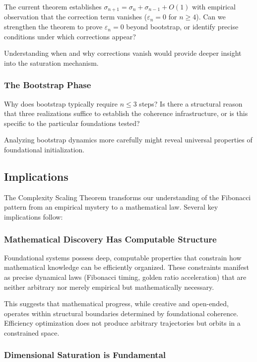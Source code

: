 \documentclass[11pt]{article}
\theoremstyle{definition}
\theoremstyle{remark}
\begin{document}
The current theorem establishes $\sigma_{n+1} = \sigma_n + \sigma_{n-1} + O(1)$ with empirical observation
that the correction term vanishes ($\varepsilon_n = 0$ for $n \geq 4$). Can we strengthen the theorem to
prove $\varepsilon_n = 0$ beyond bootstrap, or identify precise conditions under which corrections appear?

Understanding when and why corrections vanish would provide deeper insight into the saturation
mechanism.

\subsubsection{The Bootstrap Phase}

Why does bootstrap typically require $n \leq 3$ steps? Is there a structural reason that three
realizations suffice to establish the coherence infrastructure, or is this specific to the particular
foundations tested?

Analyzing bootstrap dynamics more carefully might reveal universal properties of foundational
initialization.

\subsection{Implications}

The Complexity Scaling Theorem transforms our understanding of the Fibonacci pattern from an
empirical mystery to a mathematical law. Several key implications follow:

\subsubsection{Mathematical Discovery Has Computable Structure}

Foundational systems possess deep, computable properties that constrain how mathematical knowledge
can be efficiently organized. These constraints manifest as precise dynamical laws (Fibonacci timing,
golden ratio acceleration) that are neither arbitrary nor merely empirical but mathematically
necessary.

This suggests that mathematical progress, while creative and open-ended, operates within structural
boundaries determined by foundational coherence. Efficiency optimization does not produce arbitrary
trajectories but orbits in a constrained space.

\subsubsection{Dimensional Saturation is Fundamental}
\end{document}
